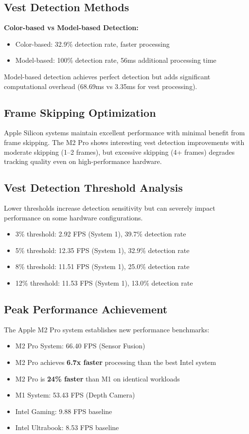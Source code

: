 \documentclass[11pt, a4paper]{article}
\begin{document}
\subsection{Vest Detection Methods}
\textbf{Color-based vs Model-based Detection:}
\begin{itemize}
    \item Color-based: 32.9\% detection rate, faster processing
    \item Model-based: 100\% detection rate, 56ms additional processing time
\end{itemize}

Model-based detection achieves perfect detection but adds significant computational overhead (68.69ms vs 3.35ms for vest processing).

\subsection{Frame Skipping Optimization}
Apple Silicon systems maintain excellent performance with minimal benefit from frame skipping. The M2 Pro shows interesting vest detection improvements with moderate skipping (1--2 frames), but excessive skipping (4+ frames) degrades tracking quality even on high-performance hardware.

\subsection{Vest Detection Threshold Analysis}
Lower thresholds increase detection sensitivity but can severely impact performance on some hardware configurations.

\begin{itemize}
    \item 3\% threshold: 2.92 FPS (System 1), 39.7\% detection rate
    \item 5\% threshold: 12.35 FPS (System 1), 32.9\% detection rate
    \item 8\% threshold: 11.51 FPS (System 1), 25.0\% detection rate
    \item 12\% threshold: 11.53 FPS (System 1), 13.0\% detection rate
\end{itemize}

\subsection{Peak Performance Achievement}
The Apple M2 Pro system establishes new performance benchmarks:

\begin{itemize}
    \item M2 Pro System: 66.40 FPS (Sensor Fusion)
        \item M2 Pro achieves \textbf{6.7x faster} processing than the best Intel system
        \item M2 Pro is \textbf{24\% faster} than M1 on identical workloads
    \item M1 System: 53.43 FPS (Depth Camera)
    \item Intel Gaming: 9.88 FPS baseline
    \item Intel Ultrabook: 8.53 FPS baseline
\end{itemize}
\end{document}

